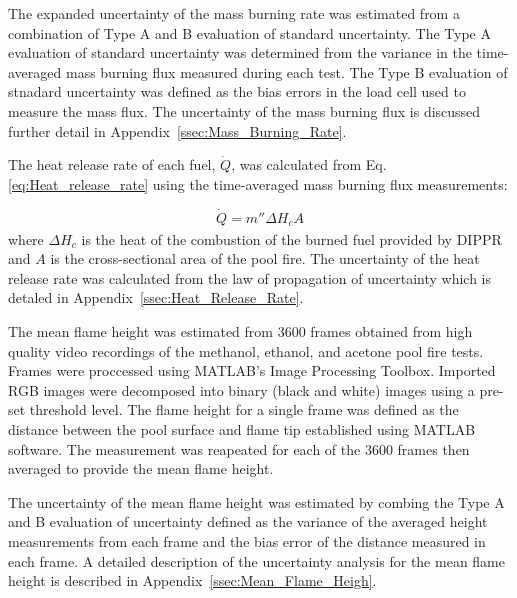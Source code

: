 \documentclass[12pt]{article}
\begin{document}
The expanded uncertainty of the mass burning rate was estimated from a combination of Type A and B evaluation of standard uncertainty. The Type A evaluation of standard uncertainty was determined from the variance in the time-averaged mass burning flux measured during each test. The Type B evaluation of stnadard uncertainty was defined as the bias errors in the load cell used to measure the mass flux. The uncertainty of the mass burning flux is discussed further detail in Appendix~\ref{ssec:Mass_Burning_Rate}.

The heat release rate of each fuel, $\dot{Q}$, was calculated from Eq.\ref{eq:Heat_release_rate} using the time-averaged mass burning flux measurements:

\begin{equation}\label{eq:Heat_release_rate}
\dot{Q}= m''\Delta H_{c}A
\end{equation}
where $\Delta H_{c}$ is the heat of the combustion of the burned fuel provided by DIPPR\textsuperscript{\textregistered} and $A$ is the cross-sectional area of the pool fire. The uncertainty of the heat release rate was calculated from the law of propagation of uncertainty which is detaled in Appendix~\ref{ssec:Heat_Release_Rate}.

The mean flame height was estimated from 3600 frames obtained from high quality video recordings of the methanol, ethanol, and acetone pool fire tests. Frames were proccessed using MATLAB’s Image Processing Toolbox. Imported RGB images were decomposed into binary (black and white) images using a pre-set threshold level. The flame height for a single frame was defined as the distance between the pool surface and flame tip established using MATLAB software. The measurement was reapeated for each of the 3600 frames then averaged to provide the mean flame height. 

The uncertainty of the mean flame height was estimated by combing the Type A and B evaluation of uncertainty defined as the variance of the averaged height measurements from each frame and the bias error of the distance measured in each frame. A detailed description of the uncertainty analysis for the mean flame height is described in Appendix~\ref{ssec:Mean_Flame_Heigh}.
\end{document}

